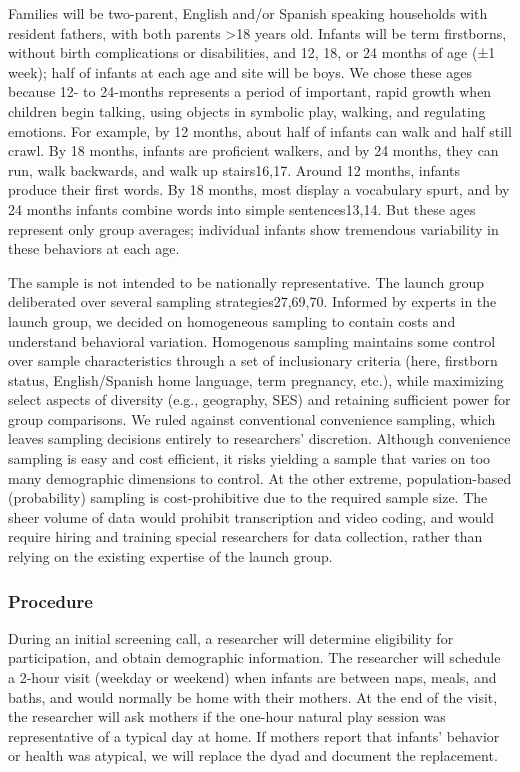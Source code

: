\documentclass[english,man]{apa6}
\theoremstyle{definition}
\theoremstyle{definition}
\theoremstyle{definition}
\theoremstyle{remark}
\begin{document}
Families will be two-parent, English and/or Spanish speaking households
with resident fathers, with both parents \textgreater{}18 years old.
Infants will be term firstborns, without birth complications or
disabilities, and 12, 18, or 24 months of age (±1 week); half of infants
at each age and site will be boys. We chose these ages because 12- to
24-months represents a period of important, rapid growth when children
begin talking, using objects in symbolic play, walking, and regulating
emotions. For example, by 12 months, about half of infants can walk and
half still crawl. By 18 months, infants are proficient walkers, and by
24 months, they can run, walk backwards, and walk up stairs16,17. Around
12 months, infants produce their first words. By 18 months, most display
a vocabulary spurt, and by 24 months infants combine words into simple
sentences13,14. But these ages represent only group averages; individual
infants show tremendous variability in these behaviors at each age.

The sample is not intended to be nationally representative. The launch
group deliberated over several sampling strategies27,69,70. Informed by
experts in the launch group, we decided on homogeneous sampling to
contain costs and understand behavioral variation. Homogenous sampling
maintains some control over sample characteristics through a set of
inclusionary criteria (here, firstborn status, English/Spanish home
language, term pregnancy, etc.), while maximizing select aspects of
diversity (e.g., geography, SES) and retaining sufficient power for
group comparisons. We ruled against conventional convenience sampling,
which leaves sampling decisions entirely to researchers' discretion.
Although convenience sampling is easy and cost efficient, it risks
yielding a sample that varies on too many demographic dimensions to
control. At the other extreme, population-based (probability) sampling
is cost-prohibitive due to the required sample size. The sheer volume of
data would prohibit transcription and video coding, and would require
hiring and training special researchers for data collection, rather than
relying on the existing expertise of the launch group.

\subsubsection{Procedure}\label{procedure-1}

During an initial screening call, a researcher will determine
eligibility for participation, and obtain demographic information. The
researcher will schedule a 2-hour visit (weekday or weekend) when
infants are between naps, meals, and baths, and would normally be home
with their mothers. At the end of the visit, the researcher will ask
mothers if the one-hour natural play session was representative of a
typical day at home. If mothers report that infants' behavior or health
was atypical, we will replace the dyad and document the replacement.
\end{document}
